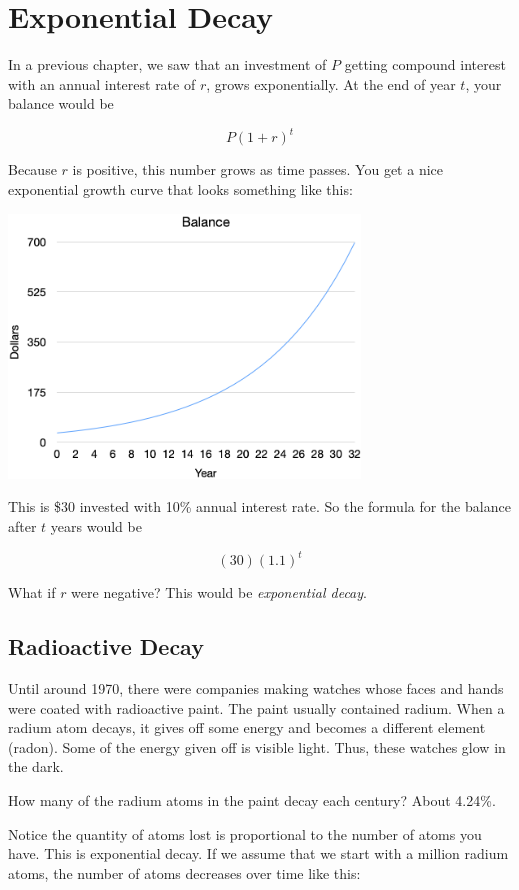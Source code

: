 \chapter{Exponential Decay}

In a previous chapter, we saw that an investment of $P$ getting
compound interest with an annual interest rate of $r$, grows
exponentially. At the end of year $t$, your balance would be

$$P\left(1 + r\right)^t$$

Because $r$ is positive, this number grows as time passes.  You get a
nice exponential growth curve that looks something like this:

\includegraphics[width=0.7\textwidth]{exponential_growth.png}

This is \$30 invested with 10\% annual interest rate. So the formula
for the balance after $t$ years would be

$$(30)(1.1)^t$$

What if $r$ were negative? This would be \textit{exponential decay}.

\section{Radioactive Decay}

Until around 1970, there were companies making watches whose faces and
hands were coated with radioactive paint. The paint usually contained
radium. When a radium atom decays, it gives off some energy and
becomes a different element (radon). Some of the energy given off is
visible light. Thus, these watches glow in the dark.

How many of the radium atoms in the paint decay each century? About 4.24\%.

Notice the quantity of atoms lost is proportional to the number of
atoms you have. This is exponential decay. If we assume that we start
with a million radium atoms, the number of atoms decreases over time like this:

